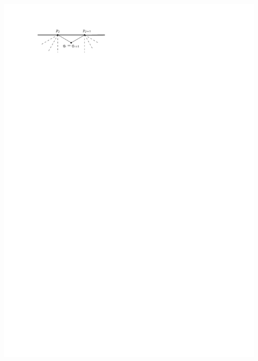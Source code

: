 \documentclass[a4paper]{article}
\begin{document}
\includegraphics[]{unifiedAlgo/img/walkProofB}
\clearpage%
\end{document}
